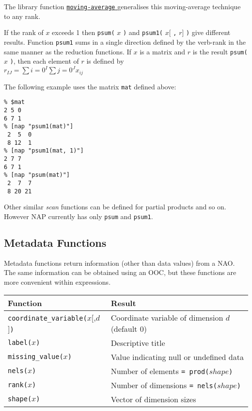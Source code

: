   \par The library function 
  \href{stat.html\#moving-average}{ \texttt{moving-average} } generalises this moving-average technique to any rank.
  \par If the rank of 
  $x$ exceeds 1 then 
  \texttt{psum(} 
  $x$ 
  \texttt{)} and 
  \texttt{psum1(} 
  $x$[
  \texttt{,} 
  $r$] 
  \texttt{)} give different results. Function 
  \texttt{psum1} sums in a single direction defined by the
  verb-rank in the same manner as the reduction functions. If 
  $x$ is a matrix and 
  $r$ is the result 
  \texttt{psum(} 
  $x$ 
  \texttt{)}, then each element of 
  $r$ is defined by
  \\
  $r_{IJ} = \sum{i=0}^I \sum{j=0}^J x_{ij}$
  \par The following example uses the matrix 
  \texttt{mat} defined above:
  \begin{verbatim}
% $mat
2 5 0
6 7 1
% [nap "psum1(mat)"]
 2  5  0
 8 12  1
% [nap "psum1(mat, 1)"]
2 7 7
6 7 1
% [nap "psum(mat)"]
 2  7  7
 8 20 21
\end{verbatim}

  \par Other similar 
  \textit{scan} functions can be defined for partial products and so
  on. However NAP currently has only 
  \texttt{psum} and 
  \texttt{psum1}.
  \subsection{
    \label{Metadata}Metadata Functions
  }
Metadata functions return information (other than data values)
  from a NAO. The same information can be obtained using an OOC, but
  these functions are more convenient within expressions.

\begin{tabular}{|l|l|}
    \hline 
      \textbf{Function} & \textbf{Result}
    \\
      \hline 
      \hline 
        \texttt{coordinate\_variable(}$x$[,$d$]\texttt{)} & Coordinate variable of dimension $d$ (default 0)
      \\
      \hline 
        \texttt{label(}$x$\texttt{)} & Descriptive title
      \\
      \hline 
        \texttt{missing\_value(}$x$\texttt{)} & Value indicating null or undefined data
      \\
      \hline 
        \texttt{nels(}$x$\texttt{)} & Number of elements \texttt{= prod(}$shape$\texttt{)}
      \\
      \hline 
        \texttt{rank(}$x$\texttt{)} & Number of dimensions \texttt{= nels(}$shape$\texttt{)}
      \\
      \hline 
        \texttt{shape(}$x$\texttt{)} & Vector of dimension sizes
      \\
  \hline
\end{tabular}

